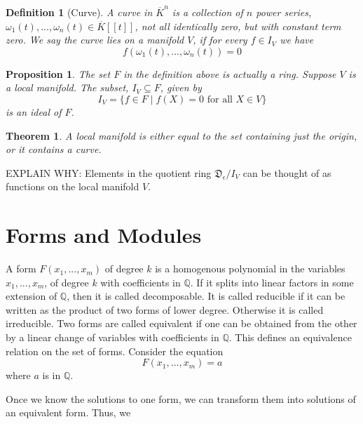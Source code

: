 \documentclass{article}
\newtheorem{theorem}{Theorem}[section]
\newtheorem{definition}{Definition}[section]
\newtheorem{proposition}{Proposition}[section]
\newcommand{\mfrak}[1]{\mathfrak{#1}}
\newcommand{\mbb}[1]{\mathbb{#1}}
\begin{document}
\begin{definition}[Curve]
    A curve in $\overline K^n$ is a collection of $n$ power series, $\omega_1(t), ..., \omega_n(t) \in \overline K[[t]]$, not all identically zero, but with constant term zero. We say the curve lies on a manifold $V$, if for every $f \in I_V$ we have $$f(\omega_1(t), ..., \omega_n(t)) = 0$$
\end{definition}

\begin{proposition}
    The set $F$ in the definition above is actually a ring. Suppose $V$ is a local manifold. The subset, $I_V \subseteq F$, given by 
    $$I_V = \{ f \in F \mid f(X) = 0 \text{ for all } X \in V\}$$ 
    is an ideal of $F$.
\end{proposition}

\begin{theorem}
    A local manifold is either equal to the set containing just the origin, or it contains a curve.
\end{theorem}


EXPLAIN WHY: Elements in the quotient ring $\mfrak D_\epsilon / I_V$ can be thought of as functions on the local manifold $V$.


\section{Forms and Modules}
A form $F(x_1, ..., x_m)$ of degree $k$ is a homogenous polynomial in the variables $x_1, ..., x_m$, of degree $k$ with coefficients in $\mbb{Q}$. If it splits into linear factors in some extension of $\mbb{Q}$, then it is called decomposable. It is called reducible if it can be written as the product of two forms of lower degree. Otherwise it is called irreducible. Two forms are called equivalent if one can be obtained from the other by a linear change of variables with coefficients in $\mbb{Q}$. This defines an equivalence relation on the set of forms. Consider the equation 
$$F(x_1, ..., x_m) = a$$
where $a$ is in $\mbb{Q}$. 

Once we know the solutions to one form, we can transform them into solutions of an equivalent form. Thus, we \
\end{document}
